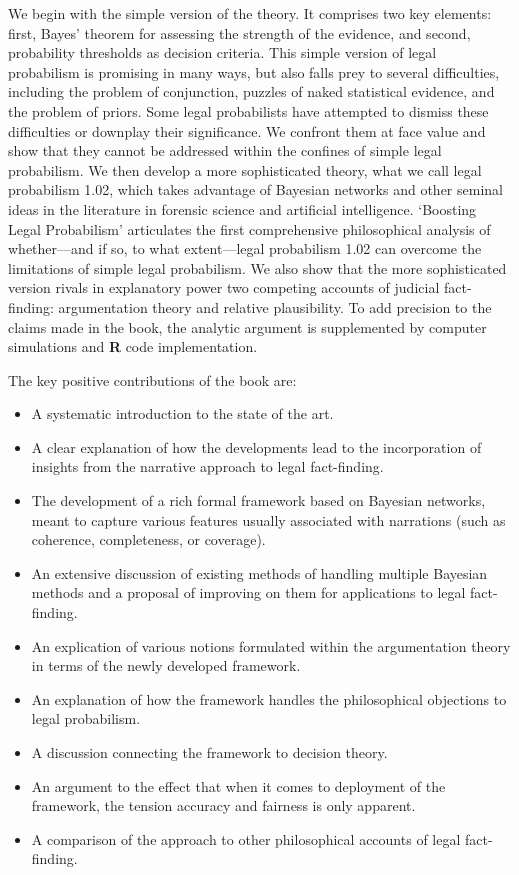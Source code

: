 \documentclass[
  10pt,
  dvipsnames,enabledeprecatedfontcommands]{scrartcl}
\begin{document}
We begin with the simple version of the theory. It comprises two key
elements: first, Bayes' theorem for assessing the strength of the
evidence, and second, probability thresholds as decision criteria. This
simple version of legal probabilism is promising in many ways, but also
falls prey to several difficulties, including the problem of
conjunction, puzzles of naked statistical evidence, and the problem of
priors. Some legal probabilists have attempted to dismiss these
difficulties or downplay their significance. We confront them at face
value and show that they cannot be addressed within the confines of
simple legal probabilism. We then develop a more sophisticated theory,
what we call legal probabilism 1.02, which takes advantage of Bayesian
networks and other seminal ideas in the literature in forensic science
and artificial intelligence. `Boosting Legal Probabilism' articulates
the first comprehensive philosophical analysis of whether---and if so,
to what extent---legal probabilism 1.02 can overcome the limitations of
simple legal probabilism. We also show that the more sophisticated
version rivals in explanatory power two competing accounts of judicial
fact-finding: argumentation theory and relative plausibility. To add
precision to the claims made in the book, the analytic argument is
supplemented by computer simulations and \textbf{\textsf{R}} code
implementation.

The key positive contributions of the book are:

\begin{itemize}
\item A systematic introduction to the state of the art.
\item A clear explanation of how the developments lead to the incorporation of insights from the narrative approach to legal fact-finding.
\item The development of a rich formal framework based on Bayesian networks, meant to capture various features usually associated with narrations (such as coherence, completeness, or coverage).
\item An extensive discussion of existing methods of handling multiple Bayesian methods and a proposal of improving on them for applications to legal fact-finding.

\item An explication of various notions formulated within the argumentation theory in terms of the newly developed framework.
\item An explanation of how the framework handles the philosophical objections to legal probabilism.
\item A discussion connecting the framework to decision theory.
\item An argument to the effect that when it comes to deployment of the framework, the tension accuracy and fairness is only apparent.
\item A comparison of the approach to other philosophical accounts of legal fact-finding.
\end{itemize}
\end{document}
